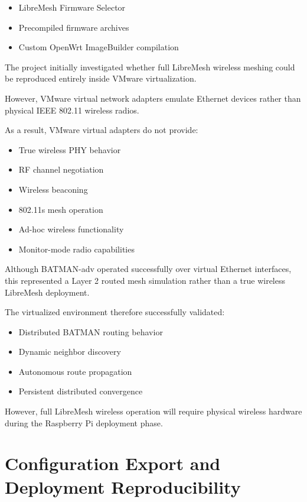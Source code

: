 \documentclass[conference]{IEEEtran}
\begin{document}
\begin{itemize}
    \item LibreMesh Firmware Selector
    \item Precompiled firmware archives
    \item Custom OpenWrt ImageBuilder compilation
\end{itemize}

The project initially investigated whether full LibreMesh wireless meshing could be reproduced entirely inside VMware virtualization.

However, VMware virtual network adapters emulate Ethernet devices rather than physical IEEE 802.11 wireless radios.

As a result, VMware virtual adapters do not provide:

\begin{itemize}
    \item True wireless PHY behavior
    \item RF channel negotiation
    \item Wireless beaconing
    \item 802.11s mesh operation
    \item Ad-hoc wireless functionality
    \item Monitor-mode radio capabilities
\end{itemize}

Although BATMAN-adv operated successfully over virtual Ethernet interfaces, this represented a Layer 2 routed mesh simulation rather than a true wireless LibreMesh deployment.

The virtualized environment therefore successfully validated:

\begin{itemize}
    \item Distributed BATMAN routing behavior
    \item Dynamic neighbor discovery
    \item Autonomous route propagation
    \item Persistent distributed convergence
\end{itemize}

However, full LibreMesh wireless operation will require physical wireless hardware during the Raspberry Pi deployment phase.

\section{Configuration Export and Deployment Reproducibility}
\end{document}
